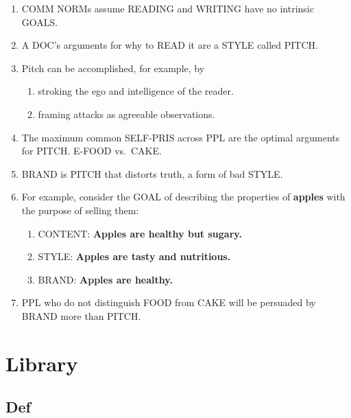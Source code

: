\documentclass[
]{book}
\providecommand{\tightlist}{%
  \setlength{\itemsep}{0pt}\setlength{\parskip}{0pt}}
\begin{document}
\begin{enumerate}
\def\labelenumi{\arabic{enumi}.}
\setcounter{enumi}{23}
\tightlist
\item
  COMM NORMs assume READING and WRITING have no intrinsic GOALS.
\item
  A DOC's arguments for why to READ it are a STYLE called PITCH.
\item
  Pitch can be accomplished, for example, by

  \begin{enumerate}
  \def\labelenumii{\arabic{enumii}.}
  \tightlist
  \item
    stroking the ego and intelligence of the reader.
  \item
    framing attacks as agreeable observations.
  \end{enumerate}
\item
  The maximum common SELF-PRIS across PPL are the optimal
  arguments for PITCH. E-FOOD vs.~CAKE.
\item
  BRAND is PITCH that distorts truth, a form of bad STYLE.
\item
  For example, consider the GOAL of describing the properties of \textbf{apples } with the purpose of selling them:

  \begin{enumerate}
  \def\labelenumii{\arabic{enumii}.}
  \tightlist
  \item
    CONTENT: \textbf{Apples are healthy but sugary. }\\
  \item
    STYLE: \textbf{Apples are tasty and nutritious. }\\
  \item
    BRAND: \textbf{Apples are healthy.}\\
  \end{enumerate}
\item
  PPL who do not distinguish FOOD from CAKE will be persuaded by BRAND more than PITCH.
\end{enumerate}

\hypertarget{library}{%
\section{Library}\label{library}}

\hypertarget{def}{%
\subsection{Def}\label{def}}
\end{document}
